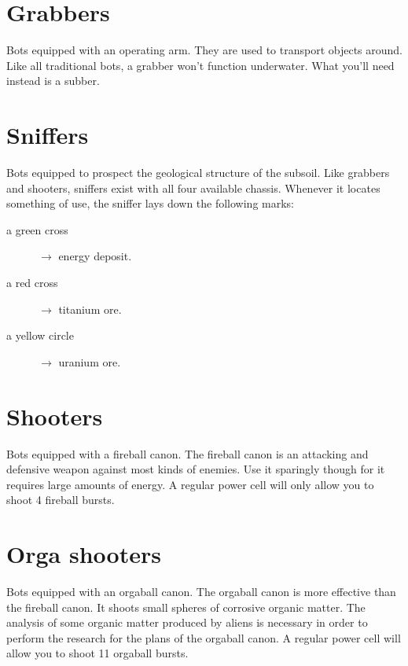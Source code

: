 \section{Grabbers}

Bots equipped with an operating arm. They are used to transport objects around. Like all traditional bots, a grabber won't function underwater. What you'll need instead is a subber.


\section{Sniffers}

Bots equipped to prospect the geological structure of the subsoil. Like grabbers and shooters, sniffers exist with all four available chassis. Whenever it locates something of use, the sniffer lays down the following marks:

\begin{description}
    \item[a green cross] $\rightarrow$ energy deposit.
    \item[a red cross] $\rightarrow$ titanium ore.
    \item[a yellow circle] $\rightarrow$ uranium ore.
\end{description}


\section{Shooters}

Bots equipped with a fireball canon. The fireball canon is an attacking and defensive weapon against most kinds of enemies. Use it sparingly though for it requires large amounts of energy. A regular power cell will only allow you to shoot 4 fireball bursts.


\section{Orga shooters}

Bots equipped with an orgaball canon. The orgaball canon is more effective than the fireball canon. It shoots small spheres of corrosive organic matter. The analysis of some organic matter produced by aliens is necessary in order to perform the research for the plans of the orgaball canon. A regular power cell will allow you to shoot 11 orgaball bursts.